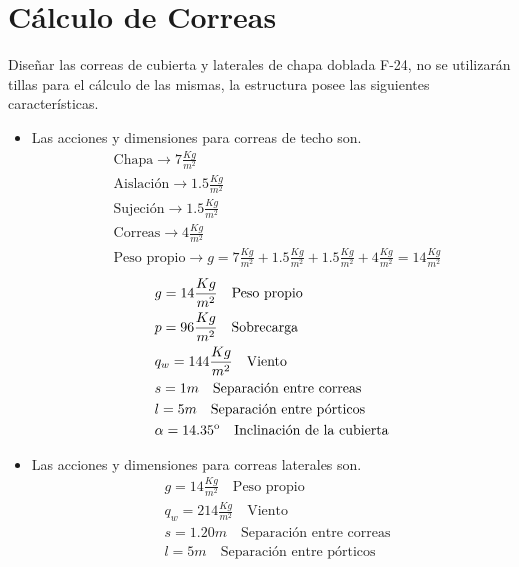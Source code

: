 \section{Cálculo de Correas}

Diseñar las correas de cubierta y laterales de chapa doblada F-24, no se utilizarán tillas para el cálculo de las mismas, la estructura posee las siguientes características.

\begin{itemize}
\item Las acciones y dimensiones para correas de techo son.
\begin{align*}
& \text{Chapa} \rightarrow 7 \frac{Kg}{m^2}\\
& \text{Aislación} \rightarrow 1.5 \frac{Kg}{m^2}\\
& \text{Sujeción} \rightarrow 1.5 \frac{Kg}{m^2}\\
& \text{Correas} \rightarrow  4 \frac{Kg}{m^2}\\
& \text{Peso propio} \rightarrow  g = 7 \frac{Kg}{m^2}+1.5 \frac{Kg}{m^2}+1.5 \frac{Kg}{m^2}+4 \frac{Kg}{m^2} = 14 \frac{Kg}{m^2}
\end{align*}
\begin{align*}
& g=14 \frac{Kg}{m^2} \quad \text{Peso propio}\\
& p=96 \frac{Kg}{m^2} \quad \text{Sobrecarga}\\
& q_w=144 \frac{Kg}{m^2} \quad \text{Viento}\\
& s= 1m \quad \text{Separación entre correas} \\
& l= 5m \quad \text{Separación entre pórticos} \\
& \alpha = 14.35\textsuperscript{o} \quad \text{Inclinación de la cubierta}
\end{align*}

\item Las acciones y dimensiones para correas laterales son.
\begin{align*}
& g=14 \frac{Kg}{m^2} \quad \text{Peso propio}\\
& q_w=214 \frac{Kg}{m^2} \quad \text{Viento}\\
& s= 1.20m \quad \text{Separación entre correas} \\
& l= 5m \quad \text{Separación entre pórticos}
\end{align*}
\end{itemize}

